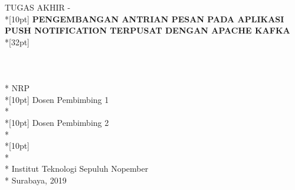 \newpage

	\sffamily
	\thispagestyle{empty}
	{ \noindent TUGAS AKHIR - \kodematkul }\\*[10pt] 
	{\large\textbf{\MakeUppercase{Pengembangan Antrian Pesan pada Aplikasi Push Notification Terpusat dengan Apache Kafka}}} \\*[32pt]
	\\
	\\
	\\
	\MakeUppercase{\penulis} \\*
	NRP \nrp \\*[10pt]
	Dosen Pembimbing 1 \\*
	\pembimbingsatu \\*[10pt]
	Dosen Pembimbing 2 \\*
	\pembimbingdua \\*[10pt]
	\MakeUppercase{\jurusan} \\*
	\fakultas \\*
	Institut Teknologi Sepuluh Nopember \\*
	Surabaya, 2019
	\rmfamily
	\normalsize
	\restoregeometry
	\color{black}
	\cleardoublepage

